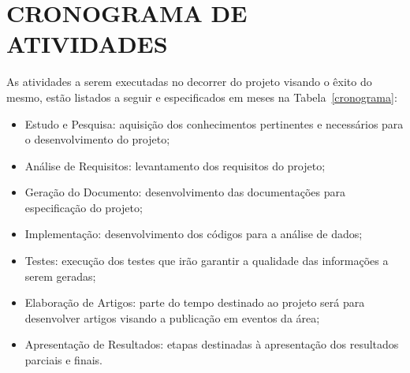 \section{CRONOGRAMA DE ATIVIDADES}\label{subsec:cronograma}

As atividades a serem executadas no decorrer do projeto visando o êxito do mesmo, estão listados a seguir e especificados em meses na Tabela~\ref{cronograma}:

\begin{itemize}
  \item Estudo e Pesquisa: aquisição dos conhecimentos pertinentes e necessários para o desenvolvimento do projeto;
  \item Análise de Requisitos: levantamento dos requisitos do projeto;
  \item Geração do Documento: desenvolvimento das documentações para especificação do projeto;
  \item Implementação: desenvolvimento dos códigos para a análise de dados;
  \item Testes: execução dos testes que irão garantir a qualidade das informações a serem geradas;
  \item Elaboração de Artigos: parte do tempo destinado ao projeto será para desenvolver artigos visando a publicação em eventos da área;
  \item Apresentação de Resultados: etapas destinadas à apresentação dos resultados parciais e finais.
\end{itemize}


\renewcommand{\arraystretch}{1.5}


